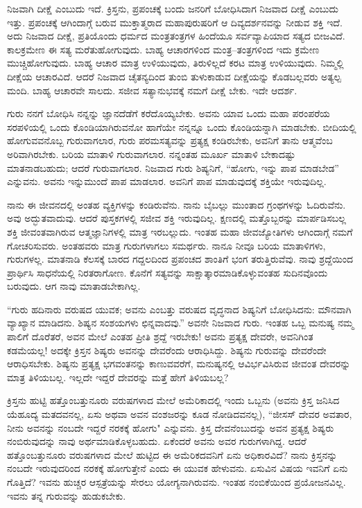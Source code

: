 ನಿಜವಾಗಿ ದೀಕ್ಷೆ ಎಂಬುದು ಇದೆ. ಕ್ರಿಸ್ತನು, ಪ್ರಪಂಚಕ್ಕೆ ಬಂದು ಜನರಿಗೆ ಬೋಧಿಸಿದಾಗ ನಿಜವಾದ ದೀಕ್ಷೆ ಎಂಬುದು ಇತ್ತು. ಪ್ರಪಂಚಕ್ಕೆ ಆಗಿಂದಾಗ್ಗೆ ಬರುವ ಮುಕ್ತಾತ್ಮರಾದ ಮಹಾಪುರುಷರಿಗೆ ಆ ದಿವ್ಯದರ್ಶನವನ್ನು ನೀಡುವ ಶಕ್ತಿ ಇದೆ. ಅದು ನಿಜವಾದ ದೀಕ್ಷೆ, ಪ್ರತಿಯೊಂದು ಧರ್ಮದ ಮಂತ್ರತಂತ್ರಗಳ ಹಿಂದೆಯೂ ಸರ್ವವ್ಯಾಪಿಯಾದ ಸತ್ಯದ ಬೀಜವಿದೆ. ಕಾಲಕ್ರಮೇಣ ಈ ಸತ್ಯ ಮರೆತುಹೋಗುವುದು. ಬಾಹ್ಯ ಆಚಾರಗಳಿಂದ ಮಂತ್ರ–ತಂತ್ರಗಳಿಂದ ಇದು ಕ್ರಮೇಣ ಮುಚ್ಚಿಹೋಗುವುದು. ಬಾಹ್ಯ ಆಚಾರ ಮಾತ್ರ ಉಳಿಯುವುದು, ತಿರುಳಿಲ್ಲದೆ ಕರಟ ಮಾತ್ರ ಉಳಿಯುವುದು. ನಿಮ್ಮಲ್ಲಿ ದೀಕ್ಷೆಯ ಆಚಾರವಿದೆ. ಆದರೆ ನಿಜವಾದ ಚೈತನ್ಯದಿಂದ ತುಂಬಿ ತುಳುಕಾಡುವ ದೀಕ್ಷೆಯನ್ನು ಕೊಡಬಲ್ಲವರು ಅತ್ಯಲ್ಪ ಮಂದಿ. ಬಾಹ್ಯ ಆಚಾರವೇ ಸಾಲದು. ಸಜೀವ ಸತ್ಯಾನುಭವಕ್ಕೆ ನಮಗೆ ದೀಕ್ಷೆ ಬೇಕು. ಇದೇ ಆದರ್ಶ.

ಗುರು ನನಗೆ ಬೋಧಿಸಿ ನನ್ನನ್ನು ಜ್ಞಾನದೆಡೆಗೆ ಕರೆದೊಯ್ಯಬೇಕು. ಅವನು ಯಾವ ಒಂದು ಮಹಾ ಪರಂಪರೆಯ ಸರಪಳಿಯಲ್ಲಿ ಒಂದು ಕೊಂಡಿಯಾಗಿರುವನೋ ಹಾಗೆಯೇ ನನ್ನನ್ನೂ ಒಂದು ಕೊಂಡಿಯನ್ನಾಗಿ ಮಾಡಬೇಕು. ಬೀದಿಯಲ್ಲಿ ಹೋಗುವವನೊಬ್ಬ ಗುರುವಾಗಲಾರ, ಗುರು ಪರಮಸತ್ಯವನ್ನು ಪ್ರತ್ಯಕ್ಷ ಕಂಡಿರಬೇಕು, ಅವನಿಗೆ ತಾನು ಆತ್ಮವೆಂಬ ಅರಿವಾಗಿರಬೇಕು. ಬರಿಯ ಮಾತಾಳಿ ಗುರುವಾಗಲಾರ. ನನ್ನಂತಹ ಮೂರ್ಖ ಮಾತಾಳಿ ಬೇಕಾದಷ್ಟು ಮಾತನಾಡಬಹುದು; ಆದರೆ ಗುರುವಾಗಲಾರ. ನಿಜವಾದ ಗುರು ಶಿಷ್ಯನಿಗೆ, “ಹೋಗು, ಇನ್ನು ಪಾಪ ಮಾಡಬೇಡ'' ಎನ್ನುವನು. ಅವನು ಇನ್ನುಮುಂದೆ ಪಾಪ ಮಾಡಲಾರ. ಅವನಿಗೆ ಪಾಪ ಮಾಡುವುದಕ್ಕೆ ಶಕ್ತಿಯೇ ಇರುವುದಿಲ್ಲ.

ನಾನು ಈ ಜೀವನದಲ್ಲಿ ಅಂತಹ ವ್ಯಕ್ತಿಗಳನ್ನು ಕಂಡಿರುವೆನು. ನಾನು ಬೈಬಲ್ಲು ಮುಂತಾದ ಗ್ರಂಥಗಳನ್ನು ಓದಿರುವೆನು. ಅವು ಅದ್ಭುತವಾದುವು. ಆದರೆ ಪುಸ್ತಕಗಳಲ್ಲಿ ಸಜೀವ ಶಕ್ತಿ ಇರುವುದಿಲ್ಲ. ಕ್ಷಣದಲ್ಲಿ ಮತ್ತೊಬ್ಬರನ್ನು ಮಾರ್ಪಡಿಸಬಲ್ಲ ಶಕ್ತಿ ಜೀವಂತವಾಗಿರುವ ಆತ್ಮಜ್ಞಾನಿಗಳಲ್ಲಿ ಮಾತ್ರ ಇರಬಲ್ಲುದು. ಇಂತಹ ಮಹಾ ಜೀವಜ್ಯೋತಿಗಳು ಆಗಿಂದಾಗ್ಗೆ ನಮಗೆ ಗೋಚರಿಸುವರು. ಅಂತಹವರು ಮಾತ್ರ ಗುರುಗಳಾಗಲು ಸಮರ್ಥರು. ನಾನೂ ನೀವೂ ಬರಿಯ ಮಾತಾಳಿಗಳು, ಗುರುಗಳಲ್ಲ. ಮಾತನಾಡಿ ಕೆಲಸಕ್ಕೆ ಬಾರದ ಗದ್ದಲದಿಂದ ಪ್ರಪಂಚದ ಶಾಂತಿಗೆ ಭಂಗ ತರುತ್ತಿರುವೆವು. ನಾವು ಶ್ರದ್ದೆಯಿಂದ ಪ್ರಾರ್ಥಿಸಿ ಸಾಧನೆಯಲ್ಲಿ ನಿರತರಾಗೋಣ. ಕೊನೆಗೆ ಸತ್ಯವನ್ನು ಸಾಕ್ಷಾತ್ಕಾರಮಾಡಿಕೊಳ್ಳುವಂತಹ ಸುದಿನವೊಂದು ಬರುವುದು. ಆಗ ನಾವು ಮಾತಾಡಬೇಕಾಗಿಲ್ಲ.

“ಗುರು ಹದಿನಾರು ವರುಷದ ಯುವಕ; ಅವನು ಎಂಬತ್ತು ವರುಷದ ವೃದ್ಧನಾದ ಶಿಷ್ಯನಿಗೆ ಬೋಧಿಸಿದನು: ಮೌನವಾಗಿ ವ್ಯಾಖ್ಯಾನ ಮಾಡಿದನು. ಶಿಷ್ಯನ ಸಂಶಯಗಳು ಛಿನ್ನವಾದವು.” ಅವನೇ ನಿಜವಾದ ಗುರು. ಇಂತಹ ಒಬ್ಬ ಮನುಷ್ಯ ನಮ್ಮ ಪಾಲಿಗೆ ದೊರೆತರೆ, ಅವನ ಮೇಲೆ ಎಂತಹ ಪ್ರೀತಿ ಶ್ರದ್ದೆ ಇರಬೇಕು! ಅವನು ಪ್ರತ್ಯಕ್ಷ ದೇವರೇ, ಅವನಿಗಿಂತ ಕಡಮೆಯಲ್ಲ! ಅದಕ್ಕೇ ಕ್ರಿಸ್ತನ ಶಿಷ್ಯರು ಅವನನ್ನು ದೇವರೆಂದು ಆರಾಧಿಸಿದ್ದು. ಶಿಷ್ಯನು ಗುರುವನ್ನು ದೇವರೆಂದೇ ಆರಾಧಿಸಬೇಕು. ಶಿಷ್ಯನು ಪ್ರತ್ಯಕ್ಷ ಭಗವಂತನನ್ನು ಕಾಣುವವರೆಗೆ, ಮನುಷ್ಯನಲ್ಲಿ ಆವಿರ್ಭವಿಸಿರುವ ಜೀವಂತ ದೇವರನ್ನು ಮಾತ್ರ ತಿಳಿಯಬಲ್ಲ. ಇಲ್ಲದೇ ಇದ್ದರೆ ದೇವರನ್ನು ಮತ್ತೆ ಹೇಗೆ ತಿಳಿಯಬಲ್ಲ?

ಕ್ರಿಸ್ತನು ಹುಟ್ಟಿ ಹತ್ತೊಂಬತ್ತುನೂರು ವರುಷಗಳಾದ ಮೇಲೆ ಅಮೆರಿಕಾದಲ್ಲಿ ಇಂದು ಒಬ್ಬನು (ಅವನು ಕ್ರಿಸ್ತ ಜನಿಸಿದ ಯೆಹೂದ್ಯ ಮತದವನಲ್ಲ, ಏಸು ಅಥವಾ ಅವನ ವಂಶಜರನ್ನು ಕೂಡ ನೋಡಿದವನಲ್ಲ), “ಜೀಸಸ್ ದೇವರ ಅವತಾರ, ನೀನು ಅವನನ್ನು ನಂಬದೇ ಇದ್ದರೆ ನರಕಕ್ಕೆ ಹೋಗು" ಎನ್ನುವನು. ಕ್ರಿಸ್ತ ದೇವನೆಂಬುದನ್ನು ಅವನ ಪ್ರತ್ಯಕ್ಷ ಶಿಷ್ಯರು ನಂಬಿರುವುದನ್ನು ನಾವು ಅರ್ಥಮಾಡಿಕೊಳ್ಳಬಹುದು. ಏಕೆಂದರೆ ಅವನು ಅವರ ಗುರುಗಳಾಗಿದ್ದ. ಆದರೆ ಹತ್ತೊಂಬತ್ತುನೂರು ವರುಷಗಳಾದ ಮೇಲೆ ಹುಟ್ಟಿದ ಈ ಅಮೆರಿಕದವನಿಗೆ ಏನು ಅಧಿಕಾರವಿದೆ? ನಾನು ಕ್ರಿಸ್ತನನ್ನು ನಂಬದೇ ಇರುವುದರಿಂದ ನರಕಕ್ಕೆ ಹೋಗುತ್ತೇನೆ ಎಂದು ಈ ಯುವಕ ಹೇಳುವನು. ಏಸುವಿನ ವಿಷಯ ಇವನಿಗೆ ಏನು ಗೊತ್ತಿದೆ? ಇವನು ಹುಚ್ಚರ ಆಸ್ಪತ್ರೆಯನ್ನು ಸೇರಲು ಯೋಗ್ಯನಾಗಿರುವನು. ಇಂತಹ ನಂಬಿಕೆಯಿಂದ ಪ್ರಯೋಜನವಿಲ್ಲ. ಇವನು ತನ್ನ ಗುರುವನ್ನು ಹುಡುಕಬೇಕು.

